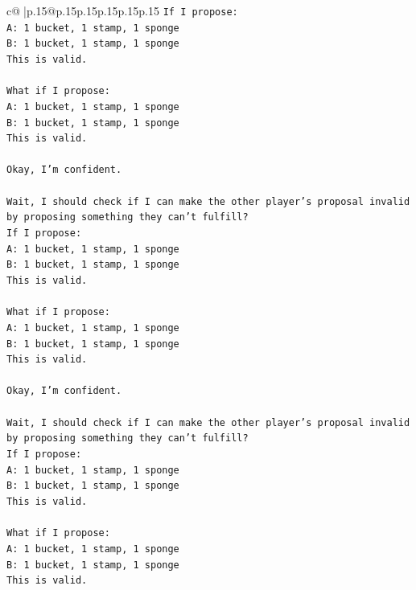\documentclass{article}
\begin{document}
{\begin{supertabular}{c@{$\;$}|p{.15\linewidth}@{}p{.15\linewidth}p{.15\linewidth}p{.15\linewidth}p{.15\linewidth}p{.15\linewidth}}
{{{\texttt{If I propose:} \\
\texttt{A: 1 bucket, 1 stamp, 1 sponge} \\
\texttt{B: 1 bucket, 1 stamp, 1 sponge} \\
\texttt{This is valid.} \\
\\ 
\texttt{What if I propose:} \\
\texttt{A: 1 bucket, 1 stamp, 1 sponge} \\
\texttt{B: 1 bucket, 1 stamp, 1 sponge} \\
\texttt{This is valid.} \\
\\ 
\texttt{Okay, I'm confident.} \\
\\ 
\texttt{Wait, I should check if I can make the other player's proposal invalid by proposing something they can't fulfill?} \\
\texttt{If I propose:} \\
\texttt{A: 1 bucket, 1 stamp, 1 sponge} \\
\texttt{B: 1 bucket, 1 stamp, 1 sponge} \\
\texttt{This is valid.} \\
\\ 
\texttt{What if I propose:} \\
\texttt{A: 1 bucket, 1 stamp, 1 sponge} \\
\texttt{B: 1 bucket, 1 stamp, 1 sponge} \\
\texttt{This is valid.} \\
\\ 
\texttt{Okay, I'm confident.} \\
\\ 
\texttt{Wait, I should check if I can make the other player's proposal invalid by proposing something they can't fulfill?} \\
\texttt{If I propose:} \\
\texttt{A: 1 bucket, 1 stamp, 1 sponge} \\
\texttt{B: 1 bucket, 1 stamp, 1 sponge} \\
\texttt{This is valid.} \\
\\ 
\texttt{What if I propose:} \\
\texttt{A: 1 bucket, 1 stamp, 1 sponge} \\
\texttt{B: 1 bucket, 1 stamp, 1 sponge} \\
\texttt{This is valid.} \\
\\ 
}}}
\end{supertabular}}
\end{document}
